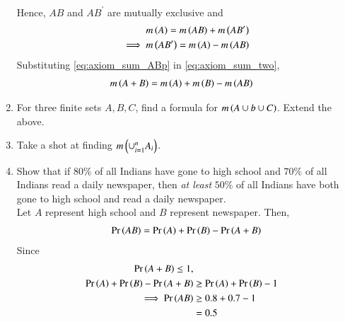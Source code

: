 \begin{enumerate}[label=\arabic*.,ref=\thesubsection.\theenumi]
\begin{align}
\label{eq:axiom_sum_AB0}
\end{align}
Hence, $AB$ and $AB^{\prime}$ are mutually exclusive and 
%
\begin{align}
m\left(A\right) = m\left(AB\right) + m\left(AB^{\prime}\right)
\\
\implies 
m\left(AB^{\prime}\right) =  m\left(A\right) - m\left(AB\right)
\label{eq:axiom_sum_ABp}
\end{align}
 Substituting \eqref{eq:axiom_sum_ABp} in \eqref{eq:axiom_sum_two}, 
\begin{align}
m\left(A+B\right) &= m\left(A\right) + m\left(B\right) - m\left(AB\right) 
\label{eq:axiom_sum_AB}
\end{align}
\item For three finite sets $A, B, C$, find a formula for $m\left(A \cup b \cup C\right)$.
	\solution Extend the above.
\item Take a shot at finding $m \left(\cup_{i=1}^{n}A_i\right)$.
\item Show that if $80 \%$ of all Indians have gone to high school and $70 \%$ of all Indians read a daily newspaper, then {\em at least} $50 \%$ of all Indians have both gone to high school and read a daily newspaper.
	\\
	\solution Let $A$ represent high school and $B$ represent newspaper.  Then, 
\begin{align}
	\Pr\left(AB\right) = \Pr\left(A\right) + \Pr\left(B\right) - \Pr\left(A+B\right)
\end{align}
Since 
\begin{align}
\Pr\left(A+B\right) \le 1, 
\\
	\Pr\left(A\right) + \Pr\left(B\right) - \Pr\left(A+B\right) &\ge 
	\Pr\left(A\right) + \Pr\left(B\right) - 1 
	\\
	\implies 
	\Pr\left(AB\right) &\ge 0.8+0.7 -1
	\\
	& = 0.5
\end{align}


\end{enumerate}
